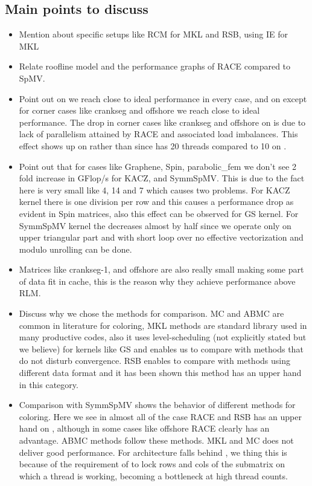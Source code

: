 \subsection{Main points to discuss}
\begin{itemize}
	\item Mention about specific setups like RCM for MKL and RSB, using IE for MKL
	\item Relate roofline model and the performance graphs of RACE compared to SpMV. 
	\item Point out on \IVB we reach close to ideal performance in every case, and on \SKX except for corner cases like crankseg and offshore we reach close to ideal performance. The drop in corner cases like crankseg and offshore on \SKX is due to lack of parallelism attained by RACE and associated load imbalances. This effect shows up on \SKX rather than \IVB since \SKX has 20 threads compared to 10 on \IVB.
	\item Point out that for cases like Graphene, Spin, parabolic\_fem we don't see 2 fold increase in GFlop/s for KACZ, and SymmSpMV. This is due to the fact here \NNZR is very small like 4, 14 and 7 which causes two problems. For KACZ kernel there is one division per row and this causes a performance drop as evident in Spin matrices, also this effect can be observed for GS kernel. For SymmSpMV kernel the \NNZR decreases almost by half since we operate only on upper triangular part and with short loop over \NNZR no effective vectorization and modulo unrolling can be done.
	\item Matrices like crankseg-1, and offshore are also really small making some part of data fit in cache, this is the reason why they achieve performance above RLM.
	\item Discuss why we chose the methods for comparison. MC and ABMC are common in literature for \DONE coloring, MKL methods are standard library used in many productive codes, also it uses level-scheduling (not explicitly stated but we believe) for kernels like GS and enables us to compare with methods that do not disturb convergence. RSB enables to compare with methods using different data format and it has been shown this method has an upper hand in this category. 
	\item Comparison with SymmSpMV shows the behavior of different methods for \DTWO coloring. Here we see in almost all of the case RACE and RSB has an upper hand on \IVB, although in some cases like offshore RACE clearly has an advantage. ABMC methods follow these methods. MKL and MC does not deliver good performance. For \SKX architecture \RSB falls behind \ABMC, we thing this is because of the requirement of \RSB to lock rows and cols of the submatrix on which a thread is working, becoming a bottleneck at high thread counts.

\end{itemize}
